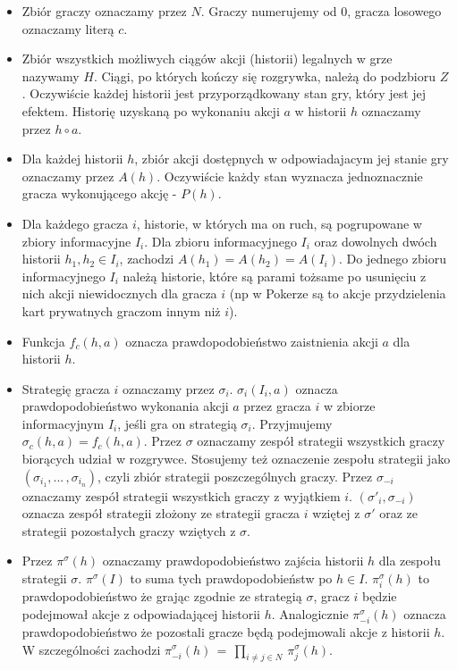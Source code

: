 \documentclass[licencjacka]{pracamgr}
\begin{document}
\begin{itemize}

\item Zbiór graczy oznaczamy przez $N$. Graczy numerujemy od $0$, gracza losowego oznaczamy literą $c$.
\item Zbiór wszystkich możliwych ciągów akcji (historii) legalnych w grze nazywamy $H$. Ciągi, po których kończy
      się rozgrywka, należą do podzbioru $Z$. Oczywiście każdej historii jest przyporządkowany stan gry, który
      jest jej efektem. Historię uzyskaną po wykonaniu akcji $a$ w historii $h$ oznaczamy przez $h \circ a$.
\item Dla każdej historii $h$, zbiór akcji dostępnych w odpowiadajacym jej stanie gry oznaczamy przez $A(h)$. Oczywiście
      każdy stan wyznacza jednoznacznie gracza wykonującego akcję - $P(h)$.
\item Dla każdego gracza $i$, historie, w których ma on ruch, są pogrupowane w zbiory informacyjne $I_i$. Dla zbioru
      informacyjnego $I_i$ oraz dowolnych dwóch historii $h_1, h_2 \in I_i$, zachodzi $A(h_1) = A(h_2) = A(I_i)$. Do jednego
      zbioru informacyjnego $I_i$ należą historie, które są parami tożsame po usunięciu z nich akcji niewidocznych dla gracza $i$
      (np w Pokerze są to akcje przydzielenia kart prywatnych graczom innym niż $i$).
\item Funkcja $f_c(h, a)$ oznacza prawdopodobieństwo zaistnienia akcji $a$ dla historii $h$.
\item Strategię gracza $i$ oznaczamy przez $\sigma_i$. $\sigma_i(I_i, a)$ oznacza prawdopodobieństwo wykonania akcji $a$ przez
      gracza $i$ w zbiorze informacyjnym $I_i$, jeśli gra on strategią $\sigma_i$. Przyjmujemy $\sigma_c(h, a) = f_c(h, a)$.
      Przez $\sigma$ oznaczamy zespół strategii wszystkich graczy biorących udział w rozgrywce. Stosujemy też oznaczenie
      zespołu strategii jako $(\sigma_{i_1}, ... \, , \sigma_{i_n})$, czyli zbiór strategii poszczególnych graczy. Przez $\sigma_{-i}$ oznaczamy
      zespół strategii wszystkich graczy z wyjątkiem $i$. $(\sigma'_i, \sigma_{-i})$ oznacza zespół strategii złożony ze strategii
      gracza $i$ wziętej z $\sigma'$ oraz ze strategii pozostałych graczy wziętych z $\sigma$.
\item Przez $\pi^{\sigma}(h)$ oznaczamy prawdopodobieństwo zajścia historii $h$ dla zespołu strategii $\sigma$.
      $\pi^{\sigma}(I)$ to suma tych prawdopodobieństw po $h \in I$. $\pi_i^{\sigma}(h)$ to prawdopodobieństwo że grając
      zgodnie ze strategią $\sigma$, gracz $i$ będzie podejmował akcje z odpowiadającej historii $h$. Analogicznie
      $\pi_{-i}^{\sigma}(h)$ oznacza prawdopodobieństwo że pozostali gracze będą podejmowali akcje z historii $h$. W szczególności
      zachodzi $\pi_{-i}^{\sigma}(h) \, = \, \prod\limits_{i \neq j \in N} \, \pi_j^{\sigma}(h)$.
\end{itemize}
\end{document}
